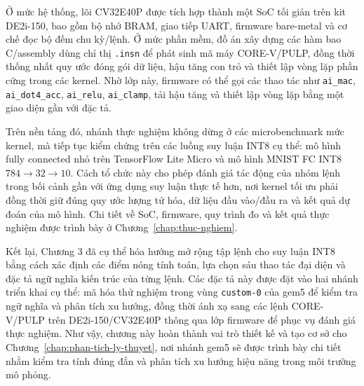\documentclass[../DoAn.tex]{subfiles}
\begin{document}
Ở mức hệ thống, lõi CV32E40P được tích hợp thành một SoC tối giản trên kit DE2i-150, bao gồm bộ nhớ BRAM, giao tiếp UART, firmware bare-metal và cơ chế đọc bộ đếm chu kỳ/lệnh. Ở mức phần mềm, đồ án xây dựng các hàm bao C/assembly dùng chỉ thị \texttt{.insn} để phát sinh mã máy CORE-V/PULP, đồng thời thống nhất quy ước đóng gói dữ liệu, hậu tăng con trỏ và thiết lập vòng lặp phần cứng trong các kernel. Nhờ lớp này, firmware có thể gọi các thao tác như \texttt{ai\_mac}, \texttt{ai\_dot4\_acc}, \texttt{ai\_relu}, \texttt{ai\_clamp}, tải hậu tăng và thiết lập vòng lặp bằng một giao diện gần với đặc tả.

Trên nền tảng đó, nhánh thực nghiệm không dừng ở các microbenchmark mức kernel, mà tiếp tục kiểm chứng trên các luồng suy luận INT8 cụ thể: mô hình fully connected nhỏ trên TensorFlow Lite Micro và mô hình MNIST FC INT8 \(784 \rightarrow 32 \rightarrow 10\). Cách tổ chức này cho phép đánh giá tác động của nhóm lệnh trong bối cảnh gần với ứng dụng suy luận thực tế hơn, nơi kernel tối ưu phải đồng thời giữ đúng quy ước lượng tử hóa, dữ liệu đầu vào/đầu ra và kết quả dự đoán của mô hình. Chi tiết về SoC, firmware, quy trình đo và kết quả thực nghiệm được trình bày ở Chương~\ref{chap:thuc-nghiem}.

Kết lại, Chương 3 đã cụ thể hóa hướng mở rộng tập lệnh cho suy luận INT8 bằng cách xác định các điểm nóng tính toán, lựa chọn sáu thao tác đại diện và đặc tả ngữ nghĩa kiến trúc của từng lệnh. Các đặc tả này được đặt vào hai nhánh triển khai cụ thể: mã hóa thử nghiệm trong vùng \texttt{custom-0} của gem5 để kiểm tra ngữ nghĩa và phân tích xu hướng, đồng thời ánh xạ sang các lệnh CORE-V/PULP trên DE2i-150/CV32E40P thông qua lớp firmware để phục vụ đánh giá thực nghiệm. Như vậy, chương này hoàn thành vai trò thiết kế và tạo cơ sở cho Chương~\ref{chap:phan-tich-ly-thuyet}, nơi nhánh gem5 sẽ được trình bày chi tiết nhằm kiểm tra tính đúng đắn và phân tích xu hướng hiệu năng trong môi trường mô phỏng.
\end{document}
